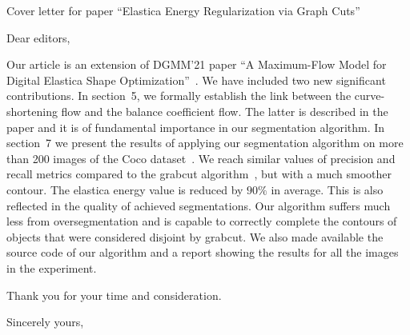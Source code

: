 \documentclass{letter}
\begin{document}
\begin{letter}{Cover letter for paper ``Elastica Energy Regularization via Graph Cuts''}
\opening{Dear editors,}

Our article is an extension of DGMM'21 paper ``A Maximum-Flow Model
for Digital Elastica Shape Optimization''~\cite{antunes21}. We have
included two new significant contributions. In section~5, we formally
establish the link between the curve-shortening flow and the balance
coefficient flow. The latter is described in the paper and it is of
fundamental importance in our segmentation algorithm.  In section~7 we
present the results of applying our segmentation algorithm on more
than 200 images of the Coco dataset~\cite{lin2014microsoft}. We reach
similar values of precision and recall metrics compared to the grabcut
algorithm~\cite{rother04grabcut}, but with a much smoother
contour. The elastica energy value is reduced by $90\%$ in average.
This is also reflected in the quality of achieved segmentations. Our
algorithm suffers much less from oversegmentation and is capable to
correctly complete the contours of objects that were considered
disjoint by grabcut. We also made available the source code of our
algorithm and a report showing the results for all the images in the
experiment.

Thank you for your time and consideration.

\closing{Sincerely yours,}




\end{letter}


\end{document}

